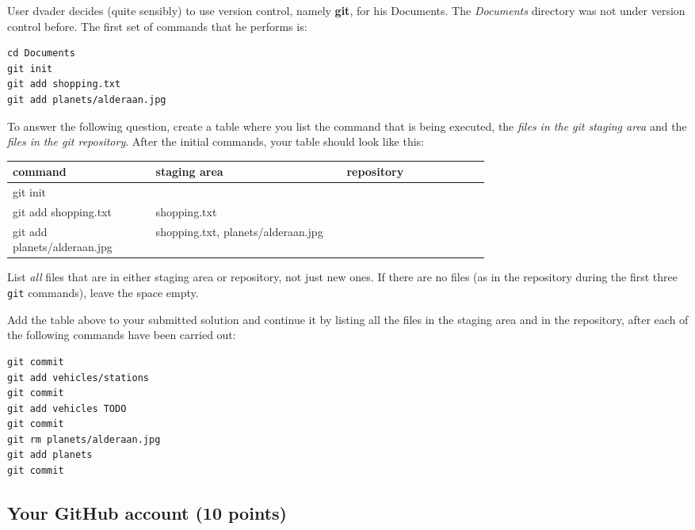\documentclass[letterpaper]{scrartcl}
\begin{document}
User dvader decides (quite sensibly) to use version control, namely
\textbf{git}, for his Documents. The \emph{Documents} directory was
not under version control before.  The first set of commands that he
performs is:
\begin{verbatim}
cd Documents
git init
git add shopping.txt
git add planets/alderaan.jpg
\end{verbatim}

To answer the following question, create a table where you list the
command that is being executed, the \emph{files in the git staging
  area} and the \emph{files in the git repository}. After the initial
commands, your table should look like this:

\begin{center}
  \begin{tabular}{lp{0.4\linewidth}p{0.3\linewidth}}
    \toprule
    command & staging area & repository\\
    \midrule
    git init & & \\
    git add shopping.txt & shopping.txt & \\
    git add planets/alderaan.jpg & shopping.txt, planets/alderaan.jpg & \\
    \bottomrule                           
  \end{tabular}
\end{center}

List \emph{all} files that are in either staging area or repository,
not just new ones. If there are no files (as in the repository during
the first three \texttt{git} commands), leave the space empty.

Add the table above to your submitted solution and continue it by
listing all the files in the staging area and in the repository, after
each of the following commands have been carried out:
\begin{verbatim}
git commit
git add vehicles/stations
git commit
git add vehicles TODO
git commit
git rm planets/alderaan.jpg
git add planets
git commit
\end{verbatim}



\subsection{Your GitHub account (10 points)}
\end{document}
